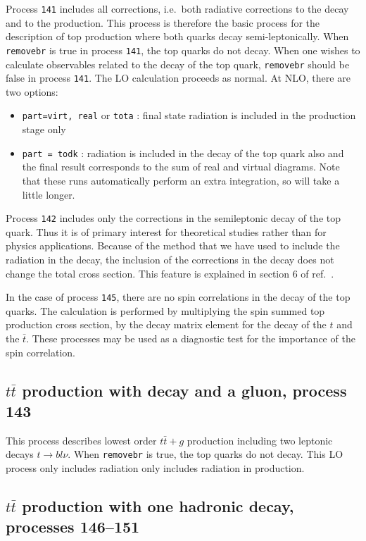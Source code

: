 \documentclass[12pt]{article}
\begin{document}
Process {\tt 141} includes all corrections, i.e.\ both radiative corrections
to the decay and to the production. This process is therefore the
basic process for the description of top production where both quarks
decay semi-leptonically.  When {\tt removebr} is true in process {\tt 141},
the top quarks do not decay.
When one wishes to calculate observables related to the decay of the top
quark, {\tt removebr} should be false in process {\tt 141}.
The LO calculation proceeds as normal. 
At NLO, there are two options:
\begin{itemize}
\item {\tt part=virt, real} or {\tt tota} : final state radiation is included
in the production stage only
\item {\tt part = todk} : radiation is included in the decay of the top
quark also and the final result corresponds to the sum of real and virtual
diagrams. 
Note that these runs automatically perform an extra integration, so
will take a little longer.
\end{itemize}

Process {\tt 142} includes only the corrections in
the semileptonic decay of the top quark. Thus it is of primary
interest for theoretical studies rather than for physics applications.  
Because of the method that we have used to include the radiation in the decay,
the inclusion of the corrections in the decay does not change the
total cross section. This feature is explained in section 6 of ref.~\cite{Campbell:2012uf}.

In the case of process {\tt 145}, there are no spin correlations in
the decay of the top quarks. The calculation is performed by
multiplying the spin summed top production cross section, by the decay
matrix element for the decay of the $t$ and the $\bar{t}$. These
processes may be used as a diagnostic test for the importance of the
spin correlation.



\subsection{$t\bar{t}$ production with decay and a gluon, process 143}
This process describes lowest order $t \bar{t}+g$ production 
including two leptonic decays $t \to b l \nu$. 
When {\tt removebr} is true, the top quarks do not decay.
This LO process only includes radiation only includes radiation in production.

\subsection{$t\bar{t}$ production with one hadronic decay, processes 146--151}
\end{document}

